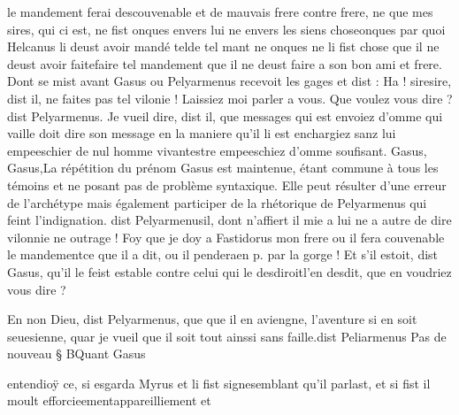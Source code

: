 \documentclass{article}
\begin{document}
\begin{pages}
                  le mandement ferai descouvenable et de mauvais frere contre frere, ne que mes sires, qui ci est, ne fist onques
                  envers lui ne envers les siens 
                     choseonques par quoi Helcanus li deust 
                     avoir mandé 
                           telde tel mant ne onques ne li fist chose que il ne deust avoir faitefaire tel mandement que il ne deust faire a son bon ami et frere. Dont se mist avant Gasus ou Pelyarmenus recevoit
               les gages 
                  et dist : Ha ! 
                     siresire, dist il, ne faites pas tel vilonie ! Laissiez moi parler a vous.
               Que voulez vous 
                     dire ? dist Pelyarmenus.
               Je vueil dire, dist il, que messages qui est envoiez
                  d’omme qui vaille doit dire son message en la maniere qu’il li est enchargiez sanz
                  lui 
                     empeeschier de nul homme vivantestre empeeschiez d'omme soufisant.
               Gasus, Gasus,La répétition du prénom Gasus est maintenue, étant commune
                     à tous les témoins et ne posant pas de problème syntaxique. Elle peut résulter
                     d'une erreur de l'archétype mais également participer de la rhétorique de
                     Pelyarmenus qui feint l'indignation. dist 
                     Pelyarmenusil, 
                     dont n’affiert il mie a lui ne a autre 
                     de dire vilonnie ne outrage ! Foy que je doy a Fastidorus mon frere 
                     ou il fera couvenable le mandementce que il a dit, ou il 
                     penderaen p. par la gorge !
               Et s’il estoit, dist Gasus, qu’il le feist 
                     estable contre celui qui 
                     le desdiroitl'en desdit, 
                     que en voudriez vous dire ?
               
                     En non Dieu, dist Pelyarmenus, que que il en aviengne, l’aventure si en soit 
                     seuesienne, 
                     quar je vueil que il soit tout ainssi sans faille.dist Peliarmenus \pend
            \pstart Pas de nouveau § BQuant
                  Gasus
               
                  entendioÿ ce, si esgarda Myrus et li fist 
                  signesemblant qu’il parlast, et si fist il moult 
                  efforcieementappareilliement et 


\end{pages}
\end{document}
